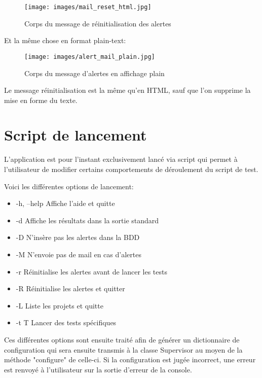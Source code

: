 \begin{figure}[h!]
	\centering
	\texttt{[image: images/mail\_reset\_html.jpg]}
	\caption{Corps du message de réinitialisation des alertes}
\end{figure}


Et la même chose en format plain-text:

\begin{figure}[h!]
	\centering
	\texttt{[image: images/alert\_mail\_plain.jpg]}
	\caption{Corps du message d'alertes en affichage plain}
\end{figure}

Le message réinitialisation est la même qu'en HTML, sauf que l'on supprime la mise en forme du texte.

\newpage

\section*{Script de lancement}

L'application est pour l'instant exclusivement lancé via script qui permet à l'utilisateur de modifier certains comportements de déroulement du script de test.

Voici les différentes options de lancement:

\begin{itemize}
\item -h, --help  Affiche l'aide et quitte
\item -d          Affiche les résultats dans la sortie standard
\item -D          N'insère pas les alertes dans la BDD
\item -M          N'envoie pas de mail en cas d'alertes
\item -r          Réinitialise les alertes avant de lancer les tests
\item -R          Réinitialise les alertes et quitter
\item -L          Liste les projets et quitte
\item -t T        Lancer des tests spécifiques
\end{itemize}


Ces différentes options sont ensuite traité afin de générer un dictionnaire de configuration qui sera ensuite transmis à la classe Supervisor au moyen de la méthode "configure" de celle-ci.
Si la configuration est jugée incorrect, une erreur est renvoyé à l'utilisateur sur la sortie d'erreur de la console.

